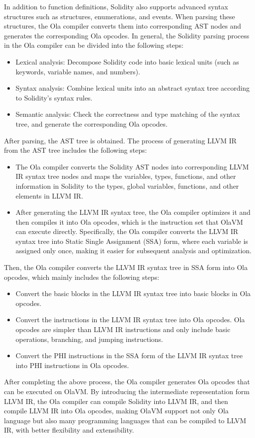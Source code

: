 In addition to function definitions, Solidity also supports advanced syntax structures such as structures, enumerations, and events. When parsing these structures, the Ola compiler converts them into corresponding AST nodes and generates the corresponding Ola opcodes. In general, the Solidity parsing process in the Ola compiler can be divided into the following steps:

\begin{itemize}
    \item Lexical analysis: Decompose Solidity code into basic lexical units (such as keywords, variable names, and numbers).
    \item Syntax analysis: Combine lexical units into an abstract syntax tree according to Solidity's syntax rules.
    \item Semantic analysis: Check the correctness and type matching of the syntax tree, and generate the corresponding Ola opcodes.
\end{itemize}

After parsing, the AST tree is obtained. The process of generating LLVM IR from the AST tree includes the following steps:

\begin{itemize}
    \item The Ola compiler converts the Solidity AST nodes into corresponding LLVM IR syntax tree nodes and maps the variables, types, functions, and other information in Solidity to the types, global variables, functions, and other elements in LLVM IR.
    \item After generating the LLVM IR syntax tree, the Ola compiler optimizes it and then compiles it into Ola opcodes, which is the instruction set that OlaVM can execute directly. Specifically, the Ola compiler converts the LLVM IR syntax tree into Static Single Assignment (SSA)\cite{website:SSA} form, where each variable is assigned only once, making it easier for subsequent analysis and optimization.
\end{itemize}

Then, the Ola compiler converts the LLVM IR syntax tree in SSA form into Ola opcodes, which mainly includes the following steps:
\begin{itemize}
    \item Convert the basic blocks in the LLVM IR syntax tree into basic blocks in Ola opcodes.
    \item Convert the instructions in the LLVM IR syntax tree into Ola opcodes. Ola opcodes are simpler than LLVM IR instructions and only include basic operations, branching, and jumping instructions.
    \item Convert the PHI instructions\cite{website:phi-instruction} in the SSA form of the LLVM IR syntax tree into PHI instructions in Ola opcodes.
\end{itemize}
After completing the above process, the Ola compiler generates Ola opcodes that can be executed on OlaVM. By introducing the intermediate representation form LLVM IR, the Ola compiler can compile Solidity into LLVM IR, and then compile LLVM IR into Ola opcodes, making OlaVM support not only Ola language but also many programming languages that can be compiled to LLVM IR, with better flexibility and extensibility.

